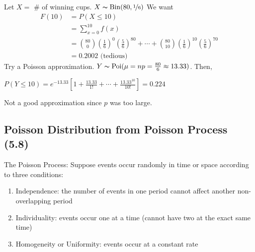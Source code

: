 Let $ X= $ \# of winning cups. $ X \thicksim \operatorname{Bin}(80,\nicefrac{1}{6}) $
We want
\begin{align*}
    F(10)&=P(X\le 10)\\
    &=\sum\limits_{x=0}^{10} f(x)\\
    &=\binom{80}{0}\left(\frac{1}{6}\right)^0\left(\frac{5}{6}\right)^{80}+\cdots+
    \binom{80}{10}\left(\frac{1}{6}\right)^{10}\left(\frac{5}{6}\right)^{70}\\
    &=0.2002 \text{ (tedious) }
\end{align*}
Try a Poisson approximation.
$ Y \thicksim \operatorname{Poi}(\mu=np=\frac{80}{6}\approx 13.33) $. Then, 

$ P(Y\le 10)=e^{-13.33}\left[1+\frac{13.33}{1!}+\cdots+\frac{13.33^{10}}{10!}\right]=0.224 $

Not a good approximation since $ p $ was too large.

\subsection{Poisson Distribution from Poisson Process (5.8)}
The Poisson Process: Suppose events occur randomly in time or space
according to three conditions:
\begin{enumerate}[(1)]
    \item Independence: the number of events in one period cannot affect another non-overlapping period
    \item Individuality: events occur one at a time (cannot have two at the exact same time)
    \item Homogeneity or Uniformity: events occur at a constant rate
\end{enumerate}